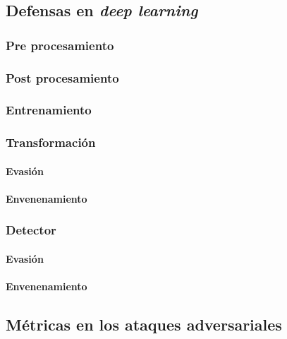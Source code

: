 \subsection{Defensas en \textit{deep learning}} \label{sec:defense}
\subsubsection{Pre procesamiento}
\subsubsection{Post procesamiento}
\subsubsection{Entrenamiento}
\subsubsection{Transformación}
\paragraph{Evasión}
\paragraph{Envenenamiento}
\subsubsection{Detector}
\paragraph{Evasión}
\paragraph{Envenenamiento}


\subsection{Métricas en los ataques adversariales}






